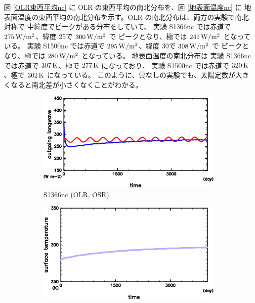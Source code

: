 \documentclass[body]{subfiles}
\begin{document}
図 \ref{OLR東西平均nc} に OLR の東西平均の南北分布を、図 \ref{地表面温度nc} に
地表面温度の東西平均の南北分布を示す。OLR の南北分布は、両方の実験で南北対称で
中緯度でピークがある分布をしていて、
実験 S1366nc では赤道で \(275\hmu{W/m^2}\)、緯度 25\textdegree で \(300\hmu{W/m^2}\) で
ピークとなり、極では \(241\hmu{W/m^2}\) となっている。
実験 S1500nc では赤道で \(295\hmu{W/m^2}\)、緯度 30\textdegree で \(308\hmu{W/m^2}\) で
ピークとなり、極では \(280\hmu{W/m^2}\) となっている。
地表面温度の南北分布は
実験 S1366nc では赤道で \(307\hmu{K}\)、極で \(277\hmu{K}\) になっており、
実験 S1500nc では赤道で \(320\hmu{K}\)、極で \(302\hmu{K}\) になっている。
このように、雲なしの実験でも、太陽定数が大きくなると南北差が小さくなくことがわかる。

\begin{figure}[t]
	\centering
	\begin{subfigure}{.4\textwidth}
		\centering
		\includegraphics[width=\textwidth]{S1366-nc/S1366nc_OLRA-OSRA_horimean_time0.0-4015.0-crop.png}
		\caption{S1366nc (OLR, OSR)}\label{S1366nc_OLRA}
	\end{subfigure}
	\begin{subfigure}{.4\textwidth}
		\centering
		\includegraphics[width=\textwidth]{S1366-nc/S1366nc_SurfTemp_horimean_time0.0-4015.0-crop.png}

\end{subfigure}
\end{figure}
\end{document}
